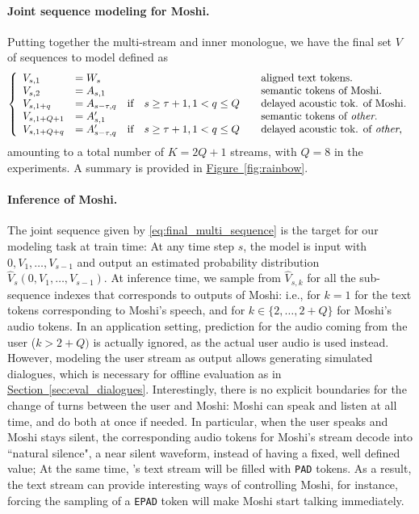 \paragraph{Joint sequence modeling for Moshi.}

Putting together the multi-stream and inner monologue, we have the final set $V$ of sequences to model defined as
\begin{equation}
\label{eq:final_multi_sequence}
    \left\{\begin{array}{lll}
    V_{s, 1} &= W_{s} \quad &\text{aligned text tokens.} \\
    V_{s, 2} &= A_{s, 1} \quad &\text{semantic tokens of Moshi.}\\
    V_{s, 1 + q} &= A_{s - \tau, q} \quad \text{if}\quad s \geq \tau + 1, 1 < q \leq Q \quad &\text{delayed acoustic tok. of Moshi.}\\
    V_{s, 1 + Q + 1} &= A'_{s, 1} \quad &\text{semantic tokens of \emph{other}.}\\
    V_{s, 1 + Q + q} &= A'_{s - \tau, q} \quad \text{if}\quad s \geq \tau + 1, 1 < q \leq Q\quad &\text{delayed acoustic tok. of \emph{other},}\\
    \end{array}\right.
\end{equation}
amounting to a total number of $K=2Q+1$ streams, with $Q=8$ in the experiments. 
A summary is provided in \hyperref[fig:rainbow]{Figure~\ref{fig:rainbow}}.

\paragraph{Inference of Moshi.}
The joint sequence given by \autoref{eq:final_multi_sequence} is the target for our modeling task at train time: At any time step $s$, the model is input with $0, V_1, \ldots, V_{s - 1}$ and output an estimated probability distribution $\hat{V}_{s}(0, V_1, \ldots, V_{s - 1})$.
At inference time, we sample from $\hat{V}_{s, k}$ for all the sub-sequence indexes that corresponds to outputs of Moshi: i.e., for $k=1$ for the text tokens corresponding to Moshi's speech, and for $k \in \{2, \ldots, 2 + Q\}$ for Moshi's audio tokens. In an application setting, prediction for the audio coming from the user ($k > 2 + Q)$ is actually ignored, as the actual user audio is used instead. However, modeling the user stream as output allows generating simulated dialogues, which is necessary for offline evaluation as in \hyperref[sec:eval_dialogues]{Section~\ref{sec:eval_dialogues}}. Interestingly, there is no explicit boundaries for the change of turns between the user and Moshi: Moshi can speak and listen at all time, and do both at once if needed. In particular, when the user speaks and Moshi stays silent, the corresponding audio tokens for Moshi's stream decode into ``natural silence", a near silent waveform, instead of having a fixed, well defined value; At the same time, \ours{}'s text stream will be filled with \texttt{PAD} tokens. As a result, the text stream can provide interesting ways of controlling Moshi, for instance, forcing the sampling of a \texttt{EPAD} token will make Moshi start talking immediately.
